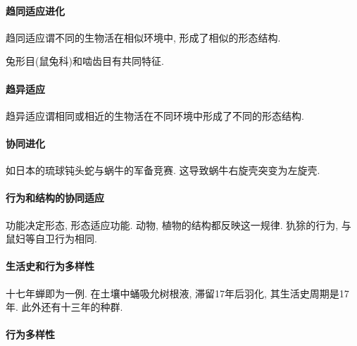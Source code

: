\documentclass{ctexart}
\begin{document}
\paragraph{趋同适应进化} %
\label{par:趋同适应进化}

趋同适应谓不同的生物活在相似环境中, 形成了相似的形态结构.
\begin{ex}
    兔形目(鼠兔科)和啮齿目有共同特征.
\end{ex}


\paragraph{趋异适应} %
\label{par:趋异适应}

趋异适应谓相同或相近的生物活在不同环境中形成了不同的形态结构.


\paragraph{协同进化} %
\label{par:协同进化}

如日本的琉球钝头蛇与蜗牛的军备竞赛. 这导致蜗牛右旋壳突变为左旋壳.


\paragraph{行为和结构的协同适应} %
\label{par:行为和结构的协同适应}

功能决定形态, 形态适应功能. 动物, 植物的结构都反映这一规律. 犰狳的行为, 与鼠妇等自卫行为相同.


\paragraph{生活史和行为多样性} %
\label{par:生活史和行为多样性}

十七年蝉即为一例. 在土壤中蛹吸允树根液, 滞留17年后羽化, 其生活史周期是17年. 此外还有十三年的种群.


\paragraph{行为多样性} %
\label{par:行为多样性}
\end{document}
